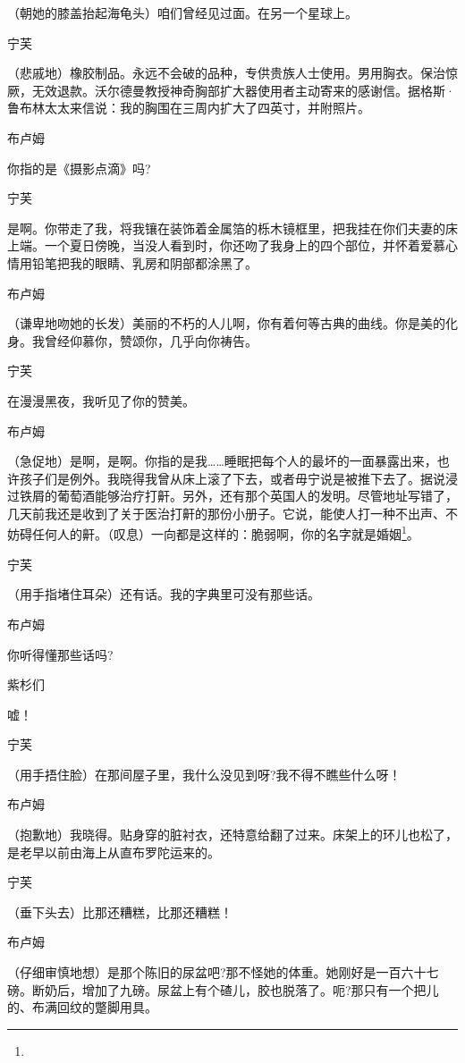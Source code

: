 \par （朝她的膝盖抬起海龟头）咱们曾经见过面。在另一个星球上。
\par 宁芙
\par （悲戚地）橡胶制品。永远不会破的品种，专供贵族人士使用。男用胸衣。保治惊厥，无效退款。沃尔德曼教授神奇胸部扩大器使用者主动寄来的感谢信。据格斯·鲁布林太太来信说：我的胸围在三周内扩大了四英寸，并附照片。
\par 布卢姆
\par 你指的是《摄影点滴》吗?
\par 宁芙
\par 是啊。你带走了我，将我镶在装饰着金属箔的栎木镜框里，把我挂在你们夫妻的床上端。一个夏日傍晚，当没人看到时，你还吻了我身上的四个部位，并怀着爱慕心情用铅笔把我的眼睛、乳房和阴部都涂黑了。
\par 布卢姆
\par （谦卑地吻她的长发）美丽的不朽的人儿啊，你有着何等古典的曲线。你是美的化身。我曾经仰慕你，赞颂你，几乎向你祷告。
\par 宁芙
\par 在漫漫黑夜，我听见了你的赞美。
\par 布卢姆
\par （急促地）是啊，是啊。你指的是我……睡眠把每个人的最坏的一面暴露出来，也许孩子们是例外。我晓得我曾从床上滚了下去，或者毋宁说是被推下去了。据说浸过铁屑的葡萄酒能够治疗打鼾。另外，还有那个英国人的发明。尽管地址写错了，几天前我还是收到了关于医治打鼾的那份小册子。它说，能使人打一种不出声、不妨碍任何人的鼾。（叹息）一向都是这样的：脆弱啊，你的名字就是婚姻\footnote{}。
\par 宁芙
\par （用手指堵住耳朵）还有话。我的字典里可没有那些话。
\par 布卢姆
\par 你听得懂那些话吗?
\par 紫杉们
\par 嘘！
\par 宁芙
\par （用手捂住脸）在那间屋子里，我什么没见到呀?我不得不瞧些什么呀！
\par 布卢姆
\par （抱歉地）我晓得。贴身穿的脏衬衣，还特意给翻了过来。床架上的环儿也松了，是老早以前由海上从直布罗陀运来的。
\par 宁芙
\par （垂下头去）比那还糟糕，比那还糟糕！
\par 布卢姆
\par （仔细审慎地想）是那个陈旧的尿盆吧?那不怪她的体重。她刚好是一百六十七磅。断奶后，增加了九磅。尿盆上有个碴儿，胶也脱落了。呃?那只有一个把儿的、布满回纹的蹩脚用具。
